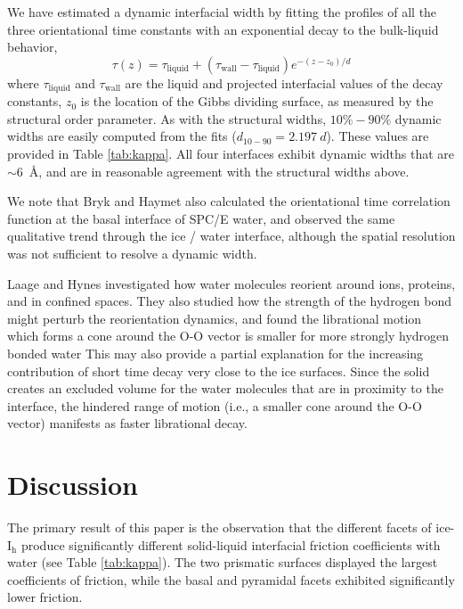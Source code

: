 \documentclass[journal = jpccck, manuscript = article]{achemso}
\begin{document}
We have estimated a dynamic interfacial width by fitting the profiles
of all the three orientational time constants with an exponential
decay to the bulk-liquid behavior,
\begin{equation}\label{tauFit}
  \tau(z) = \tau_\mathrm{liquid}+(\tau_\mathrm{wall}-\tau_\mathrm{liquid})e^{-(z-z_{0})/d}
\end{equation}
where $\tau_\mathrm{liquid}$ and $\tau_\mathrm{wall}$ are the liquid
and projected interfacial values of the decay constants, $z_{0}$ is
the location of the Gibbs dividing surface, as measured by the
structural order parameter.  As with the structural widths,
$10\%-90\%$ dynamic widths are easily computed from the fits
($d_\mathrm{10-90} = 2.197~d$).  These values are provided in Table
\ref{tab:kappa}. All four interfaces exhibit dynamic widths that are
$\sim 6$~\AA, and are in reasonable agreement with the structural
widths above.

We note that Bryk and Haymet also calculated the orientational time
correlation function at the basal interface of SPC/E
water,\cite{Bryk2002} and observed the same qualitative trend through
the ice / water interface, although the spatial resolution was not
sufficient to resolve a dynamic width.
 
Laage and Hynes investigated how water molecules reorient around
ions\cite{Laage2007,Laage2008a,Stirnemann2011a,Laage2011},
proteins\cite{Duboue-Dijon2014}, and in confined
spaces\cite{Laage2012b,Fogarty2014}.  They also studied how the
strength of the hydrogen bond might perturb the reorientation
dynamics,\cite{Laage2006a} and found the librational motion which
forms a cone around the O-O vector is smaller for more strongly
hydrogen bonded water This may also provide a partial explanation for
the increasing contribution of short time decay very close to the ice
surfaces.  Since the solid creates an excluded volume for the water
molecules that are in proximity to the interface, the hindered range
of motion (i.e., a smaller cone around the O-O vector) manifests as
faster librational decay.

\section{Discussion}
The primary result of this paper is the observation that the different
facets of ice-I$_\mathrm{h}$ produce significantly different
solid-liquid interfacial friction coefficients with water (see Table
\ref{tab:kappa}).  The two prismatic surfaces displayed the largest
coefficients of friction, while the basal and pyramidal facets
exhibited significantly lower friction.
\end{document}
